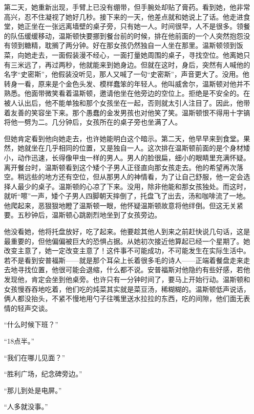 第二天，她重新出现，手臂上已没有绷带，但手腕处却贴了膏药。看到她，他非常高兴，忍不住凝视了她好几秒。接下来的一天，他差点就和她说上了话。他走进食堂，她正坐在一张远离墙壁的桌子旁，只有她一人。时间很早，人不是很多。领餐的队伍缓缓移动，温斯顿快要挪到餐台前的时候，排在他前面的一个人突然抱怨没有领到糖精，耽搁了两分钟。好在那女孩仍然独自一人坐在那里。温斯顿领到饭菜，向她走去，一面假装漫不经心，一面打量她周围的桌子，寻找空位。他离她只有三米远了，再过两秒，他就能来到她身边。但就在这时，身后，突然有人喊他的名字``史密斯''，他假装没听见，那人又喊了一句``史密斯''，声音更大了。没用。他转身一看，原来是个金色头发、模样蠢笨的年轻人。他叫威舍尔，温斯顿对他并不熟悉。他面带微笑看着温斯顿，邀请他坐在他旁边的空位上。拒绝是不安全的。在被人认出后，他不能单独和那个女孩坐在一起，否则就太引人注目了。因此，他带着友善的笑容坐下来。那个愚蠢的金发男孩也对他笑了笑。温斯顿恨不得用十字镐将他一劈为二。几分钟后，女孩所在的桌子旁也坐满了人。

但她肯定看到他向她走去，也许她能明白这个暗示。第二天，他早早来到食堂。果然，她就坐在几乎相同的位置，又是独自一人。这次排在温斯顿前面的是个身材矮小，动作迅速，长得像甲虫一样的男人。男人的脸很扁，细小的眼睛里充满怀疑。离开餐台时，温斯顿看到这个矮个子男人正径直向那女孩走去。他的希望再次落空。稍远些的地方还有空位，但从那男人的神情看，为了让自己舒服，他一定会选择人最少的桌子。温斯顿的心凉了下来。没用，除非他能和那女孩独处。而这时，就听``嚓''一声，矮个子男人四脚朝天摔倒了，托盘飞了出去，汤和咖啡流了一地。他爬起来，恶狠狠地瞪了温斯顿一眼，他怀疑温斯顿故意将他绊倒。但这无关紧要。五秒钟后，温斯顿心跳剧烈地坐到了女孩旁边。

他没看她，他将托盘放好，吃了起来。他要趁其他人到来之前赶快说几句话，这是最重要的，但他偏偏被巨大的恐惧占据。从她初次接近他算起已经一个星期了。她改变主意了，她一定改变主意了！这件事不可能成功，不可能发生在实际生活中。若不是看到安普福斯------就是那个耳朵上长着很多毛的诗人------正端着餐盘走来走去地寻找位置，他很可能会退缩，什么都不说。安普福斯对他隐约有些好感，若他发现他，肯定会坐到他桌旁。也许只有一分钟时间了，要马上开始行动。温斯顿和女孩慢吞吞地吃着，他们吃的炖菜其实就是菜豆汤，稀糊糊的。温斯顿低声说话，俩人都没抬头，不紧不慢地用勺子往嘴里送水拉拉的东西，吃的间隙，他们面无表情的轻声交谈。

``什么时候下班？''

``18点半。''

``我们在哪儿见面？''

``胜利广场，纪念碑旁边。''

``那儿到处是电屏。''

``人多就没事。''

